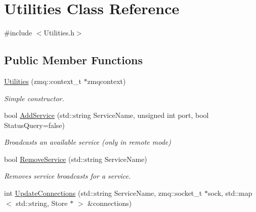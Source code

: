 \hypertarget{classUtilities}{\section{Utilities Class Reference}
\label{classUtilities}
}


{\ttfamily \#include $<$Utilities.\-h$>$}

\subsection*{Public Member Functions}
\begin{DoxyCompactItemize}
\item 
\hypertarget{classUtilities_a33c76f03fb859da0f0b65b80e631f0ec}{\hyperlink{classUtilities_a33c76f03fb859da0f0b65b80e631f0ec}{Utilities} (zmq\-::context\-\_\-t $\ast$zmqcontext)}\label{classUtilities_a33c76f03fb859da0f0b65b80e631f0ec}

\begin{DoxyCompactList}\small\item\em Simple constructor. \end{DoxyCompactList}\item 
\hypertarget{classUtilities_ab145803bd7737c99387c14658a292be2}{bool \hyperlink{classUtilities_ab145803bd7737c99387c14658a292be2}{Add\-Service} (std\-::string Service\-Name, unsigned int port, bool Status\-Query=false)}\label{classUtilities_ab145803bd7737c99387c14658a292be2}

\begin{DoxyCompactList}\small\item\em Broadcasts an available service (only in remote mode) \end{DoxyCompactList}\item 
\hypertarget{classUtilities_aacca3879a00425cf9aa93b0160d25b9f}{bool \hyperlink{classUtilities_aacca3879a00425cf9aa93b0160d25b9f}{Remove\-Service} (std\-::string Service\-Name)}\label{classUtilities_aacca3879a00425cf9aa93b0160d25b9f}

\begin{DoxyCompactList}\small\item\em Removes service broadcasts for a service. \end{DoxyCompactList}\item 
\hypertarget{classUtilities_acbad29ad93ad54b6feb6c9a4427ebafc}{int \hyperlink{classUtilities_acbad29ad93ad54b6feb6c9a4427ebafc}{Update\-Connections} (std\-::string Service\-Name, zmq\-::socket\-\_\-t $\ast$sock, std\-::map$<$ std\-::string, Store $\ast$ $>$ \&connections)}\label{classUtilities_acbad29ad93ad54b6feb6c9a4427ebafc}


\end{DoxyCompactItemize}
